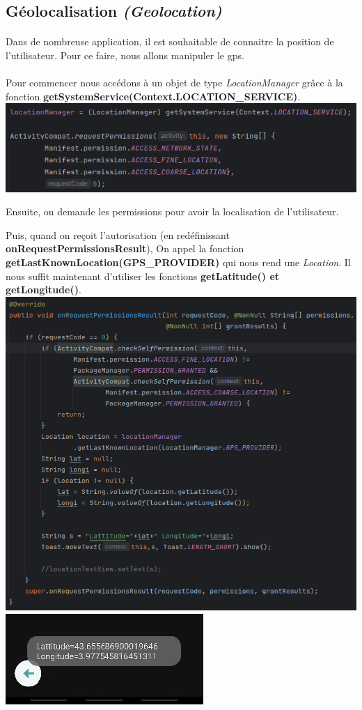 \documentclass[a4paper]{article}
\begin{document}
\begin{multicols}{2}
        \section{Géolocalisation \emph{(Geolocation)}}
            \paragraph{}
                Dans de nombreuse application, il est souhaitable de connaitre la position de l'utilisateur. Pour ce faire, nous allons manipuler le gps.

            \paragraph{}
                Pour commencer nous accédons à un objet de type \emph{LocationManager} grâce à la fonction \textbf{getSystemService(Context.LOCATION\_SERVICE)}.
                \noindent\includegraphics[width=.49\textwidth]{geo/request}

                Ensuite, on demande les permissions pour avoir la localisation de l'utilisateur.
                
                Puis, quand on reçoit l'autorisation (en redéfinissant \textbf{onRequestPermissionsResult}), On appel la fonction \textbf{getLastKnownLocation(GPS\_PROVIDER)} qui nous rend une \emph{Location}. Il nous suffit maintenant d'utiliser les fonctions \textbf{getLatitude() et getLongitude()}.
                \noindent\includegraphics[width=.49\textwidth]{geo/onRequest}
                \noindent\includegraphics[width=.49\textwidth]{geo/screenshotSmall}

\end{multicols}
\end{document}
